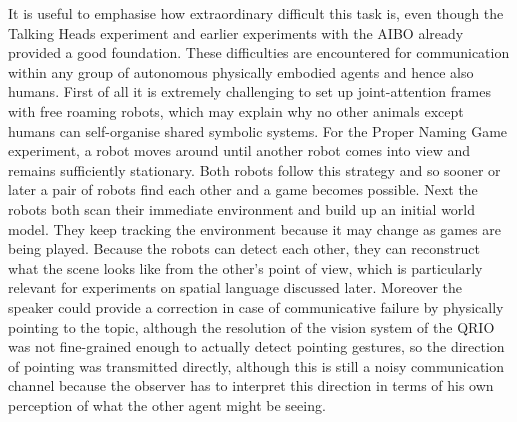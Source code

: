 It is useful to emphasise how extraordinary difficult this task is, even though the Talking Heads experiment and 
earlier experiments with the AIBO already 
provided a good foundation. These difficulties are encountered for communication within any group of
autonomous physically embodied agents and hence also humans. 
First of all it is extremely challenging to set up joint-attention frames with free roaming
robots, which may explain why no other animals except humans can self-organise
shared symbolic systems. For the Proper Naming Game experiment, a robot moves around until another robot comes into 
view and remains sufficiently 
stationary. Both robots follow this strategy and so sooner or later a pair of robots find each other
and a game becomes possible. Next the robots both scan their immediate environment and build up an initial world model. 
They keep tracking the environment because it may change as games are being played. 
Because the robots can detect each other, they can reconstruct what the scene looks like from the other's point of 
view, which is particularly relevant for experiments on spatial language discussed later. 
Moreover the speaker could provide a correction in case of 
communicative failure by physically pointing to the topic, although the resolution of the vision system of the QRIO was not 
fine-grained enough to actually detect pointing gestures, so the direction of pointing was transmitted directly, although
this is still a noisy communication channel because the observer has to interpret this direction in terms of his own 
perception of what the other agent might be seeing. 

